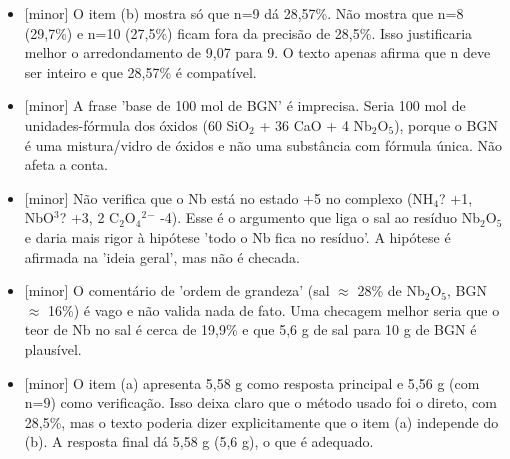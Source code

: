 \documentclass{article}%
\begin{document}
\begin{itemize}%
\item%
{[}minor{]} O item (b) mostra só que n=9 dá 28,57\%. Não mostra que n=8 (29,7\%) e n=10 (27,5\%) ficam fora da precisão de 28,5\%. Isso justificaria melhor o arredondamento de 9,07 para 9. O texto apenas afirma que n deve ser inteiro e que 28,57\% é compatível.%
\item%
{[}minor{]} A frase 'base de 100 mol de BGN' é imprecisa. Seria 100 mol de unidades{-}fórmula dos óxidos (60 SiO$_{2}$ + 36 CaO + 4 Nb$_{2}$O$_{5}$), porque o BGN é uma mistura/vidro de óxidos e não uma substância com fórmula única. Não afeta a conta.%
\item%
{[}minor{]} Não verifica que o Nb está no estado +5 no complexo (NH$_{4}$? +1, NbO$^3$? +3, 2 C$_{2}$O$_{4}$$^2$$^{-}$ -4). Esse é o argumento que liga o sal ao resíduo Nb$_{2}$O$_{5}$ e daria mais rigor à hipótese 'todo o Nb fica no resíduo'. A hipótese é afirmada na 'ideia geral', mas não é checada.%
\item%
{[}minor{]} O comentário de 'ordem de grandeza' (sal $\approx$ 28\% de Nb$_{2}$O$_{5}$, BGN $\approx$ 16\%) é vago e não valida nada de fato. Uma checagem melhor seria que o teor de Nb no sal é cerca de 19,9\% e que 5,6 g de sal para 10 g de BGN é plausível.%
\item%
{[}minor{]} O item (a) apresenta 5,58 g como resposta principal e 5,56 g (com n=9) como verificação. Isso deixa claro que o método usado foi o direto, com 28,5\%, mas o texto poderia dizer explicitamente que o item (a) independe do (b). A resposta final dá 5,58 g (5,6 g), o que é adequado.%
\end{itemize}%
\end{document}
